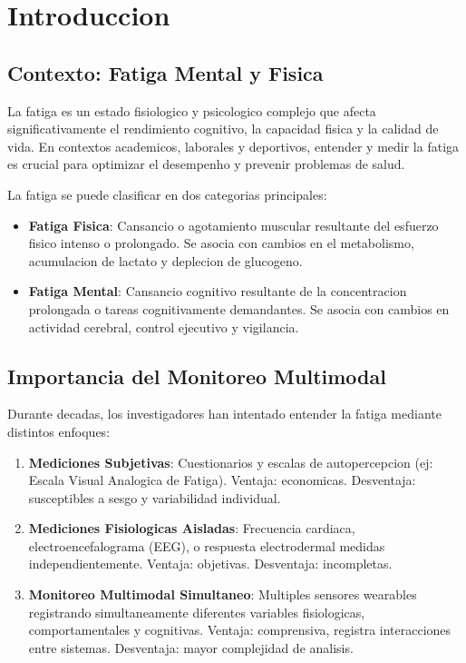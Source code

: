 \chapter{Introduccion}
\label{cap:introduction}

\section{Contexto: Fatiga Mental y Fisica}

La fatiga es un estado fisiologico y psicologico complejo que afecta significativamente
el rendimiento cognitivo, la capacidad fisica y la calidad de vida. En contextos
academicos, laborales y deportivos, entender y medir la fatiga es crucial para
optimizar el desempenho y prevenir problemas de salud.

La fatiga se puede clasificar en dos categorias principales:

\begin{itemize}
    \item \textbf{Fatiga Fisica}: Cansancio o agotamiento muscular resultante del
          esfuerzo fisico intenso o prolongado. Se asocia con cambios en el metabolismo,
          acumulacion de lactato y deplecion de glucogeno.

    \item \textbf{Fatiga Mental}: Cansancio cognitivo resultante de la concentracion
          prolongada o tareas cognitivamente demandantes. Se asocia con cambios en
          actividad cerebral, control ejecutivo y vigilancia.
\end{itemize}

\section{Importancia del Monitoreo Multimodal}

Durante decadas, los investigadores han intentado entender la fatiga mediante
distintos enfoques:

\begin{enumerate}
    \item \textbf{Mediciones Subjetivas}: Cuestionarios y escalas de autopercepcion
          (ej: Escala Visual Analogica de Fatiga). Ventaja: economicas. Desventaja:
          susceptibles a sesgo y variabilidad individual.

    \item \textbf{Mediciones Fisiologicas Aisladas}: Frecuencia cardiaca,
          electroencefalograma (EEG), o respuesta electrodermal medidas
          independientemente. Ventaja: objetivas. Desventaja: incompletas.

    \item \textbf{Monitoreo Multimodal Simultaneo}: Multiples sensores wearables
          registrando simultaneamente diferentes variables fisiologicas, comportamentales
          y cognitivas. Ventaja: comprensiva, registra interacciones entre sistemas.
          Desventaja: mayor complejidad de analisis.
\end{enumerate}

